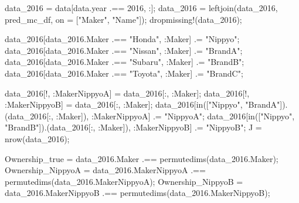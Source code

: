 \documentclass[
  letterpaper,
  DIV=11,
  numbers=noendperiod]{scrreprt}
\newenvironment{Shaded}{\begin{snugshade}}{\end{snugshade}}
\newcommand{\FloatTok}[1]{\textcolor[rgb]{0.68,0.00,0.00}{#1}}
\newcommand{\FunctionTok}[1]{\textcolor[rgb]{0.28,0.35,0.67}{#1}}
\newcommand{\NormalTok}[1]{\textcolor[rgb]{0.00,0.23,0.31}{#1}}
\newcommand{\OperatorTok}[1]{\textcolor[rgb]{0.37,0.37,0.37}{#1}}
\newcommand{\StringTok}[1]{\textcolor[rgb]{0.13,0.47,0.30}{#1}}
\begin{document}
\begin{Shaded}
\begin{Highlighting}[]
\NormalTok{data\_2016 }\OperatorTok{=}\NormalTok{ data[data.year }\OperatorTok{.==} \FloatTok{2016}\NormalTok{, }\OperatorTok{:}\NormalTok{];}
\NormalTok{data\_2016 }\OperatorTok{=} \FunctionTok{leftjoin}\NormalTok{(data\_2016, pred\_mc\_df, on }\OperatorTok{=}\NormalTok{ [}\StringTok{"Maker"}\NormalTok{, }\StringTok{"Name"}\NormalTok{]);}
\FunctionTok{dropmissing!}\NormalTok{(data\_2016);}

\NormalTok{data\_2016[data\_2016.Maker }\OperatorTok{.==} \StringTok{"Honda"}\NormalTok{, }\OperatorTok{:}\NormalTok{Maker] }\OperatorTok{.=} \StringTok{"Nippyo"}\NormalTok{;}
\NormalTok{data\_2016[data\_2016.Maker }\OperatorTok{.==} \StringTok{"Nissan"}\NormalTok{, }\OperatorTok{:}\NormalTok{Maker] }\OperatorTok{.=} \StringTok{"BrandA"}\NormalTok{;}
\NormalTok{data\_2016[data\_2016.Maker }\OperatorTok{.==} \StringTok{"Subaru"}\NormalTok{, }\OperatorTok{:}\NormalTok{Maker] }\OperatorTok{.=} \StringTok{"BrandB"}\NormalTok{;}
\NormalTok{data\_2016[data\_2016.Maker }\OperatorTok{.==} \StringTok{"Toyota"}\NormalTok{, }\OperatorTok{:}\NormalTok{Maker] }\OperatorTok{.=} \StringTok{"BrandC"}\NormalTok{;}

\NormalTok{data\_2016[!, }\OperatorTok{:}\NormalTok{MakerNippyoA] }\OperatorTok{=}\NormalTok{ data\_2016[}\OperatorTok{:}\NormalTok{, }\OperatorTok{:}\NormalTok{Maker];}
\NormalTok{data\_2016[!, }\OperatorTok{:}\NormalTok{MakerNippyoB] }\OperatorTok{=}\NormalTok{ data\_2016[}\OperatorTok{:}\NormalTok{, }\OperatorTok{:}\NormalTok{Maker];}
\NormalTok{data\_2016[}\FunctionTok{in}\NormalTok{([}\StringTok{"Nippyo"}\NormalTok{, }\StringTok{"BrandA"}\NormalTok{]).(data\_2016[}\OperatorTok{:}\NormalTok{, }\OperatorTok{:}\NormalTok{Maker]), }\OperatorTok{:}\NormalTok{MakerNippyoA] }\OperatorTok{.=} \StringTok{"NippyoA"}\NormalTok{;}
\NormalTok{data\_2016[}\FunctionTok{in}\NormalTok{([}\StringTok{"Nippyo"}\NormalTok{, }\StringTok{"BrandB"}\NormalTok{]).(data\_2016[}\OperatorTok{:}\NormalTok{, }\OperatorTok{:}\NormalTok{Maker]), }\OperatorTok{:}\NormalTok{MakerNippyoB] }\OperatorTok{.=} \StringTok{"NippyoB"}\NormalTok{;}
\NormalTok{J }\OperatorTok{=} \FunctionTok{nrow}\NormalTok{(data\_2016);}

\NormalTok{Ownership\_true }\OperatorTok{=}\NormalTok{ data\_2016.Maker }\OperatorTok{.==} \FunctionTok{permutedims}\NormalTok{(data\_2016.Maker);}
\NormalTok{Ownership\_NippyoA }\OperatorTok{=}\NormalTok{ data\_2016.MakerNippyoA }\OperatorTok{.==} \FunctionTok{permutedims}\NormalTok{(data\_2016.MakerNippyoA);}
\NormalTok{Ownership\_NippyoB }\OperatorTok{=}\NormalTok{ data\_2016.MakerNippyoB }\OperatorTok{.==} \FunctionTok{permutedims}\NormalTok{(data\_2016.MakerNippyoB);}
\end{Highlighting}
\end{Shaded}
\end{document}
